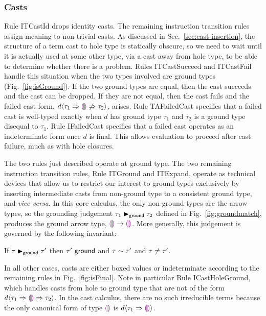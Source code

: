 \subsubsection{Casts}
Rule {ITCastId} drops identity casts. The remaining instruction transition rules assign meaning to non-trivial casts. 
As discussed in Sec.~\ref{sec:cast-insertion}, the structure of a term cast to hole type is statically obscure, 
so we need to wait until it is actually used at some other type, via a cast away from hole type, to be able to determine whether there is a problem. 
Rules {ITCastSucceed} and {ITCastFail} handle this situation when the two types involved are ground types (Fig.~\ref{fig:isGround}). 
If the two ground types are equal, then the cast succeeds and the cast can be dropped. 
If they are not equal, then the cast fails and the failed cast form, $d \langle{\tau_1}\Rightarrow{\textcolor{violet}{\llparenthesis}\textcolor{violet}{\rrparenthesis}}\not\Rightarrow{\tau_2}\rangle$, arises. 
Rule {TAFailedCast} specifies that a failed cast is well-typed exactly when $d$ has ground type $\tau_1$ and $\tau_2$ is a ground type disequal to $\tau_1$. 
Rule {IFailedCast} specifies that a failed cast operates as an indeterminate form once $d$ is final. 
This allows evaluation to proceed after cast failure, much as with hole closures.

The two rules just described operate at ground type. 
The two remaining instruction transition rules, Rule {ITGround} and {ITExpand}, operate as technical devices that allow us to restrict our interest to ground types exclusively by inserting intermediate casts from non-ground type to  a consistent ground type, and \emph{vice versa}. 
In this core calculus, the only non-ground types are the arrow types, so the grounding judgement $\tau_1 \blacktriangleright_{\mathsf{ground}} \tau_2$ defined in Fig.~\ref{fig:groundmatch}, produces the ground arrow type, $\textcolor{violet}{\llparenthesis}\textcolor{violet}{\rrparenthesis} \rightarrow \textcolor{violet}{\llparenthesis}\textcolor{violet}{\rrparenthesis}$. 
More generally, this judgement is governed by the following invariant:
\begin{lem}[Grounding] 
  If $\tau \blacktriangleright_{\mathsf{ground}} \tau'$
  then $\tau'~\mathsf{ground}$
  and $\tau \sim \tau'$
  and $\tau\neq\tau'$.
\end{lem}

In all other cases, casts are either boxed values or indeterminate according to the remaining rules in Fig.~\ref{fig:isFinal}. 
Note in particular Rule {ICastHoleGround}, which handles casts from hole to ground type that are not of the form $d \langle{\tau_1}\Rightarrow{\textcolor{violet}{\llparenthesis}\textcolor{violet}{\rrparenthesis}}\Rightarrow{\tau_2}\rangle$. 
In the cast calculus, there are no such irreducible terms because the only canonical form of type $\textcolor{violet}{\llparenthesis}\textcolor{violet}{\rrparenthesis}$ is $d \langle{\tau_1}\Rightarrow{\textcolor{violet}{\llparenthesis}\textcolor{violet}{\rrparenthesis}}\rangle$.

